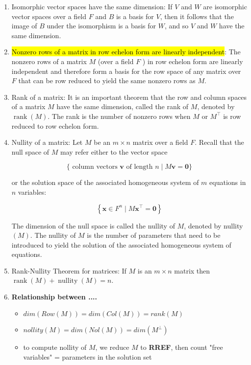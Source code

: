 \documentclass{article}
\begin{document}
\begin{enumerate}
        \item Isomorphic vector spaces have the same dimension: If $V$ and $W$ are isomorphic vector spaces over a field $F$ and $B$ is a basis for $V$, then it follows that the image of $B$ under the isomorphism is a basis for $W$, and so $V$ and $W$ have the same dimension.

        \item \hl{Nonzero rows of a matrix in row echelon form are linearly independent}: The nonzero rows of a matrix $M$ (over a field $F$ ) in row echelon form are linearly independent and therefore form a basis for the row space of any matrix over $F$ that can be row reduced to yield the same nonzero rows as $M$.

        \item Rank of a matrix: It is an important theorem that the row and column spaces of a matrix $M$ have the same dimension, called the rank of $M$, denoted by $\operatorname{rank}(M)$. The rank is the number of nonzero rows when $M$ or $M^{\top}$ is row reduced to row echelon form.

        \item Nullity of a matrix: Let $M$ be an $m \times n$ matrix over a field $F$. Recall that the null space of $M$ may refer either to the vector space

        $$
        \{\text { column vectors } \mathbf{v} \text { of length } n \mid M \mathbf{v}=\mathbf{0}\}
        $$

        or the solution space of the associated homogeneous system of $m$ equations in $n$ variables:

        $$
        \left\{\mathbf{x} \in F^{n} \mid M \mathbf{x}^{\top}=\mathbf{0}\right\}
        $$

        The dimension of the null space is called the nullity of $M$, denoted by nullity $(M)$. The nullity of $M$ is the number of parameters that need to be introduced to yield the solution of the associated homogeneous system of equations.

        \item Rank-Nullity Theorem for matrices: If $M$ is an $m \times n$ matrix then $\operatorname{rank}(M)+\operatorname{nullity}(M)=n$.


        \item \textbf{Relationship between ....}
            \begin{itemize}
                \item $dim(Row(M)) = dim(Col(M)) = rank(M)$
                \item $nollity(M) = dim(Nol(M)) = dim(M^{\perp})$
                \item to compute nollity of $M$, we reduce $M$ to \textbf{RREF}, then count "free variables" = parameters in the solution set


\end{itemize}
\end{enumerate}
\end{document}
